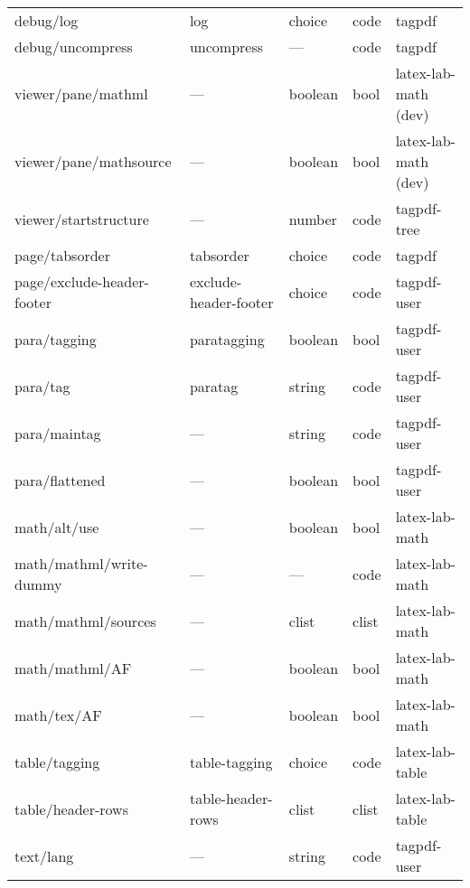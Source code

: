 \begin{tabular}{lllll}
debug/log        & log             & choice           &code  & tagpdf \\
debug/uncompress & uncompress      &  ---             &code  & tagpdf\\[4pt]\midrule  
viewer/pane/mathml &  ---          &  boolean         &bool  &latex-lab-math (dev)\\
viewer/pane/mathsource& ---        &boolean           &bool  &latex-lab-math (dev)\\
viewer/startstructure & ---        &number            &code  &tagpdf-tree \\[4pt]\midrule
page/tabsorder  &tabsorder         & choice          & code & tagpdf\\   
page/exclude-header-footer & exclude-header-footer &choice & code &tagpdf-user\\[4pt]\midrule
para/tagging     &paratagging      &boolean          &bool  &tagpdf-user\\
para/tag         &paratag          &string           &code  &tagpdf-user\\
para/maintag     &---              &string           &code  &tagpdf-user\\
para/flattened   &---              &boolean          &bool  &tagpdf-user\\[4pt]\midrule
math/alt/use     &---              &boolean          &bool  &latex-lab-math\\
math/mathml/write-dummy & ---      &---              &code  &latex-lab-math\\
math/mathml/sources &---           & clist           &clist &latex-lab-math\\
math/mathml/AF      &---           &boolean          &bool  &latex-lab-math\\
math/tex/AF       & ---            &boolean          &bool  &latex-lab-math\\[4pt]\midrule
table/tagging     & table-tagging  &choice           &code  &latex-lab-table\\
table/header-rows & table-header-rows& clist         &clist &latex-lab-table\\[4pt]\midrule
text/lang         & ---             & string         & code &tagpdf-user  
\\\bottomrule
\end{tabular}
